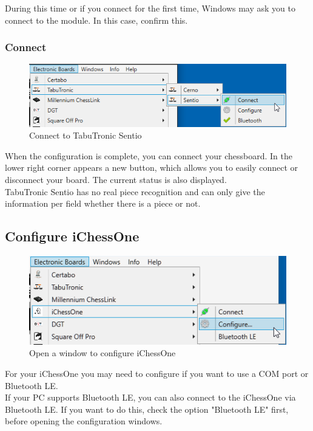 \documentclass[11pt,a4paper]{article}
\begin{document}
During this time or if you connect for the first time, Windows may ask you to connect to the module. In this case, confirm this.

\subsubsection{Connect}
\begin{figure}[H]
	\centering
	\includegraphics[scale=0.8]{Sentio3.png}
	\caption{Connect to TabuTronic Sentio}
	\label{fig:Sentio3}
\end{figure}
When the configuration is complete, you can connect your chessboard.
In the lower right corner appears a new button, which allows you to easily connect or disconnect your board. The current status is also displayed.
\\TabuTronic Sentio has no real piece recognition and can only give the information per field whether there is a piece or not.

\subsection{Configure iChessOne} \label{ConfigureIChessOne}
\begin{figure}[H]
	\centering
	\includegraphics[scale=1.0]{iChessOne1.png}
	\caption{Open a window to configure iChessOne }
	\label{fig:iChessOne1}
\end{figure}

For your iChessOne you may need to configure if you want to use a COM port or Bluetooth LE.\\
If your PC supports Bluetooth LE, you can also connect to the iChessOne via Bluetooth LE. If you want to do this, check the option "Bluetooth LE" first, before opening the configuration windows.\\
\end{document}
